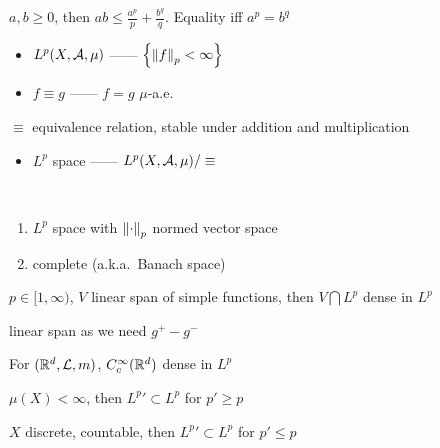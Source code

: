 \begin{lemma}
    $a, b \geq 0$, then $ab \leq \frac{a^p}{p} + \frac{b^q}{q}$.
    Equality iff $a^p = b^q$
\end{lemma}

\begin{itemize}
    \item $L^p(X, \mathcal{A}, \mu)$ ------ $\left\{ \left\lVert f\right\rVert_p < \infty \right\}$
    \item $f \equiv g$ ------ $f = g$ $\mu$-a.e.\
\end{itemize}

\begin{lemma}
    $\equiv$ equivalence relation, stable under addition and multiplication
\end{lemma}

\begin{itemize}
    \item $L^p$ space ------ $L^p(X, \mathcal{A}, \mu) / \equiv$
\end{itemize}

\begin{prop}\,
    \begin{enumerate}
        \item $L^p$ space with $\left\lVert\cdot\right\rVert_p$ normed vector space
        \item complete (a.k.a.\ Banach space)
    \end{enumerate}
\end{prop}

\begin{prop}
    $p \in [1, \infty)$, $V$ linear span of simple functions, then $V \bigcap L^p$ dense in $L^p$
\end{prop}

\begin{fact}
    linear span as we need $g^+ - g^-$
\end{fact}

\begin{fact}
    For $(\mathbb{R}^d, \mathcal{L}, m)$, $C_c^\infty(\mathbb{R}^d)$ dense in $L^p$
\end{fact}

\begin{fact}
    $\mu(X) < \infty$, then $L^p' \subset L^p$ for $p' \geq p$
\end{fact}

\begin{fact}
    $X$ discrete, countable, then $L^p' \subset L^p$ for $p' \leq p$
\end{fact}